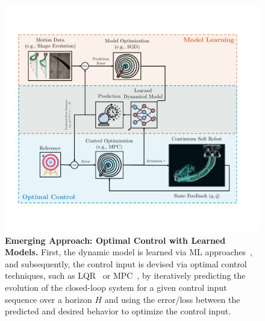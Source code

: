 \begin{figure}[ht]
    \centering
    \includegraphics[width=0.9\linewidth]{introduction/figures/optimal_control_learned_models_v1_cropped.pdf}
    \caption{\textbf{Emerging Approach: Optimal Control with Learned Models.} 
    First, the dynamic model is learned via \gls{ML} approaches~\citep{gillespie2018learning, xie2023dynamic, alora2023data, alora2023robust, kasaei2023data, liu2024physics, chen2024data, marques2024visuo}, and subsequently, the control input is devised via optimal control techniques, such as \gls{LQR}~\citep{bruder2020data, bruder2024koopman} or \gls{MPC}~\citep{gillespie2018learning, hewing2020learning, alora2023data, alora2023robust}, by iteratively predicting the evolution of the closed-loop system for a given control input sequence over a horizon $H$ and using the error/loss between the predicted and desired behavior to optimize the control input.
    }
    \label{fig:introduction:optimal_control_with_learned_models}
\end{figure}

